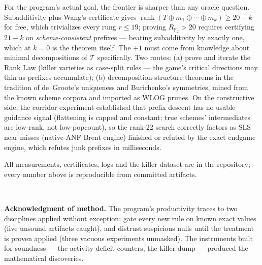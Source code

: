\documentclass[11pt]{article}
\theoremstyle{definition}
\newcommand{\F}{\mathbb{F}_2}
\newcommand{\T}{\mathcal{T}}
\newcommand{\rk}{\operatorname{rank}}
\begin{document}
For the program's actual goal, the frontier is sharper than any oracle
question. Subadditivity plus Wang's certificate gives
$\rk(T \oplus m_1 \oplus \cdots \oplus m_k) \ge 20-k$ for free, which
trivializes every rung $r \le 19$; proving $R_{\F} > 20$ requires
certifying $21-k$ on \emph{scheme-consistent} prefixes --- beating
subadditivity by exactly one, which at $k=0$ is the theorem itself. The
$+1$ must come from knowledge about minimal decompositions of $\T$
specifically. Two routes: (a) prove and iterate the Rank Law (killer
varieties as case-split rules --- the game's critical directions may
thin as prefixes accumulate); (b) decomposition-structure theorems in
the tradition of de~Groote's uniqueness and Burichenko's symmetries,
mined from the known scheme corpora and imported as WLOG prunes.
On the constructive side, the corridor experiment established that prefix
descent has no usable guidance signal (flattening is capped and constant;
true schemes' intermediates are low-rank, not low-popcount), so the
rank-22 search correctly factors as SLS near-misses (native-ANF Brent
engine) finished or refuted by the exact endgame engine, which refutes
junk prefixes in milliseconds.

All measurements, certificates, logs and the killer dataset are in the
repository; every number above is reproducible from committed artifacts.

\begin{center}\emph{---}\end{center}

\noindent\textbf{Acknowledgment of method.} The program's productivity
traces to two disciplines applied without exception: gate every new rule
on known exact values (five unsound artifacts caught), and distrust
suspicious nulls until the treatment is proven applied (three vacuous
experiments unmasked). The instruments built for soundness --- the
activity-deficit counters, the killer dump --- produced the
mathematical discoveries.
\end{document}
